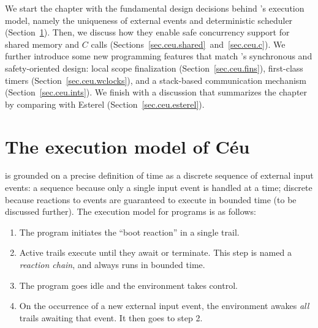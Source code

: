 We start the chapter with the fundamental design decisions behind \CEU's 
execution model, namely the uniqueness of external events and deterministic 
scheduler (Section~\ref{sec.ceu.det}).
Then, we discuss how they enable safe concurrency support for shared memory and 
$C$ calls (Sections~\ref{sec.ceu.shared}~and~\ref{sec.ceu.c}).
%
%
We further introduce some new programming features that match \CEU's 
synchronous and safety-oriented design:
local scope finalization (Section~\ref{sec.ceu.fins}),
first-class timers (Section~\ref{sec.ceu.wclocks}),
and a stack-based communication mechanism (Section~\ref{sec.ceu.ints}).
%
We finish with a discussion that summarizes the chapter by comparing \CEU with 
Esterel (Section~\ref{sec.ceu.esterel}).

\section{The execution model of C\'eu}
\label{sec.ceu.det}


\CEU is grounded on a precise definition of time as a discrete sequence of 
external input events:
a sequence because only a single input event is handled at a time; discrete 
because reactions to events are guaranteed to execute in bounded time (to be 
discussed further).
The execution model for \CEU programs is as follows:

\begin{enumerate}
\item The program initiates the ``boot reaction'' in a single trail.
\item Active trails execute until they await or terminate.
      This step is named a \emph{reaction chain}, and always runs in bounded 
      time.
\item The program goes idle and the environment takes control.
\item On the occurrence of a new external input event, the environment awakes 
      \emph{all} trails awaiting that event.
      It then goes to step 2.
\end{enumerate}

